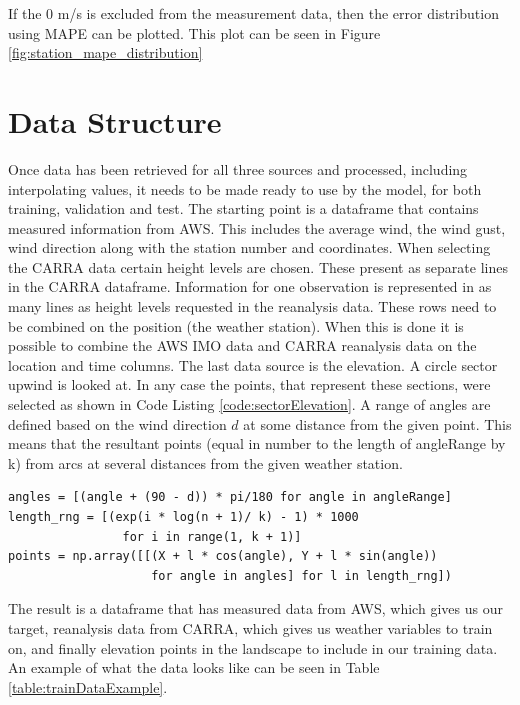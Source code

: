 If the 0 m/s is excluded from the measurement data, then the error distribution using MAPE can be plotted. This plot can be seen in Figure \ref{fig:station_mape_distribution}

\section{Data Structure}

Once data has been retrieved for all three sources and processed, including interpolating values, it needs to be made ready to use by the model, for both training, validation and test. The starting point is a dataframe that contains measured information from AWS. This includes the average wind, the wind gust, wind direction along with the station number and coordinates. When selecting the CARRA data certain height levels are chosen. These present as separate lines in the CARRA dataframe. Information for one observation is represented in as many lines as height levels requested in the reanalysis data. These rows need to be combined on the position (the weather station). When this is done it is possible to combine the AWS IMO data and CARRA reanalysis data on the location and time columns. The last data source is the elevation. A circle sector upwind is looked at. In any case the points, that represent these sections, were selected as shown in Code Listing \ref{code:sectorElevation}. A range of angles are defined based on the wind direction $d$ at some distance from the given point. This means that the resultant points (equal in number to the length of angleRange by k) from arcs at several distances from the given weather station.

\begin{lstlisting}[style = Python, caption = {Sector elevation points generated}, label = code:sectorElevation]
angles = [(angle + (90 - d)) * pi/180 for angle in angleRange]
length_rng = [(exp(i * log(n + 1)/ k) - 1) * 1000 
                for i in range(1, k + 1)]
points = np.array([[(X + l * cos(angle), Y + l * sin(angle))
                    for angle in angles] for l in length_rng])   
\end{lstlisting}

The result is a dataframe that has measured data from AWS, which gives us our target, reanalysis data from CARRA, which gives us weather variables to train on, and finally elevation points in the landscape to include in our training data. An example of what the data looks like can be seen in Table \ref{table:trainDataExample}.

